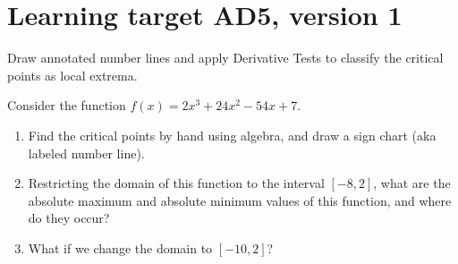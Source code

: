 
\usepackage{pgfplots}


%


\allowdisplaybreaks
\section{Learning target AD5, version 1}

Draw annotated number lines and apply Derivative Tests to classify the critical points as local extrema.

\hrulefill

Consider the function
\(f(x)=2x^{3}+24x^{2}-54x+7\).
	
	\begin{enumerate}[leftmargin=15pt]

		\item Find the critical points by hand using algebra, and draw a sign chart (aka labeled number line).

		\vfill
		\vfill
	
		\item Restricting the domain of this function to the interval $[-8, 2]$, what are the absolute maximum and absolute minimum values of this function, and where do they occur?

		\vfill
	
		
		\item What if we change the domain to $[-10, 2]$?
		
		\vfill
	
	\end{enumerate}



